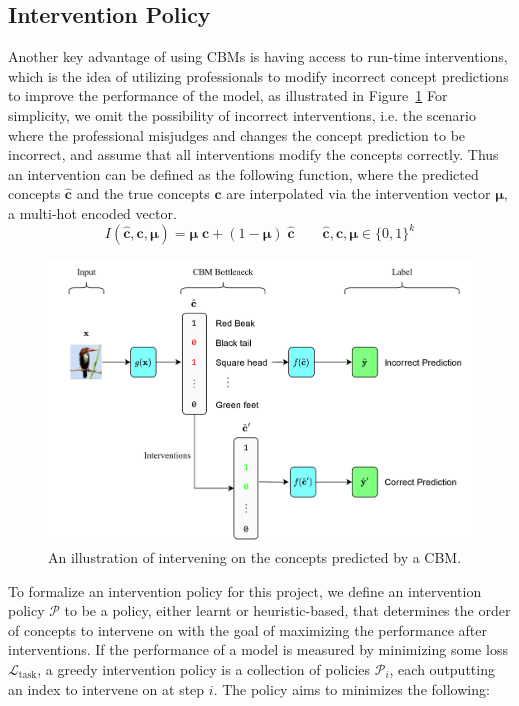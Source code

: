 \documentclass[../main.tex]{subfiles}
\begin{document}
\subsection{Intervention Policy}

Another key advantage of using CBMs is having access to 
run-time interventions, which is the idea of utilizing professionals
to modify incorrect concept predictions to improve the 
performance of the model, as illustrated in Figure~\ref{fig:cbm-interventions} For simplicity, we omit the
possibility of incorrect interventions, i.e. the scenario
where the professional misjudges and changes the concept prediction to be incorrect,
and assume that
all interventions modify the concepts correctly. Thus an intervention
can be defined as the following function, where
the predicted concepts $\hat{\mathbf{c}}$ and the true concepts $\mathbf{c}$ are interpolated
via the intervention vector $\bm{\mu}$, a multi-hot encoded vector.
\[I(\hat{\mathbf{c}}, \mathbf{c}, \bm{\mu}) = 
\bm{\mu} \; \mathbf{c} + (1 - \bm{\mu}) \; \hat{\mathbf{c}} \qquad \hat{\mathbf{c}}, \mathbf{c}, \bm{\mu} \in \{0, 1\}^k\]

\begin{figure}[!h]
    \centering
    \includegraphics[width=\textwidth]{figs/background/cbm_interventions.png}
    \caption{An illustration of intervening on the concepts predicted by a CBM.}
    \label{fig:cbm-interventions}
\end{figure}

To formalize an intervention policy for this
project, we define an intervention policy $\mathcal{P}$ to be a policy, either learnt
or heuristic-based, that determines the order of concepts to intervene 
on with the goal of maximizing the performance after interventions.
If the performance of a model is measured by minimizing some loss $\mathcal{L}_{\text{task}}$,
a greedy intervention policy is a collection of policies $\mathcal{P}_i$, each
outputting an index to intervene on at step $i$. The policy aims to minimizes 
the following:
\end{document}
